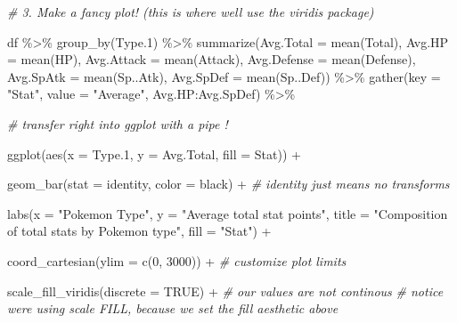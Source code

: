 \documentclass[
]{article}
\newenvironment{Shaded}{\begin{snugshade}}{\end{snugshade}}
\newcommand{\AttributeTok}[1]{\textcolor[rgb]{0.77,0.63,0.00}{#1}}
\newcommand{\CommentTok}[1]{\textcolor[rgb]{0.56,0.35,0.01}{\textit{#1}}}
\newcommand{\ConstantTok}[1]{\textcolor[rgb]{0.00,0.00,0.00}{#1}}
\newcommand{\DecValTok}[1]{\textcolor[rgb]{0.00,0.00,0.81}{#1}}
\newcommand{\FloatTok}[1]{\textcolor[rgb]{0.00,0.00,0.81}{#1}}
\newcommand{\FunctionTok}[1]{\textcolor[rgb]{0.00,0.00,0.00}{#1}}
\newcommand{\NormalTok}[1]{#1}
\newcommand{\SpecialCharTok}[1]{\textcolor[rgb]{0.00,0.00,0.00}{#1}}
\newcommand{\StringTok}[1]{\textcolor[rgb]{0.31,0.60,0.02}{#1}}
\begin{document}
\begin{Shaded}
\begin{Highlighting}[]
\CommentTok{\# 3. Make a fancy plot! (this is where we\textquotesingle{}ll use the viridis package)}

\NormalTok{df }\SpecialCharTok{\%\textgreater{}\%} 
  \FunctionTok{group\_by}\NormalTok{(Type}\FloatTok{.1}\NormalTok{) }\SpecialCharTok{\%\textgreater{}\%}
  \FunctionTok{summarize}\NormalTok{(}\AttributeTok{Avg.Total =} \FunctionTok{mean}\NormalTok{(Total),}
            \AttributeTok{Avg.HP =} \FunctionTok{mean}\NormalTok{(HP),}
            \AttributeTok{Avg.Attack =} \FunctionTok{mean}\NormalTok{(Attack),}
            \AttributeTok{Avg.Defense =} \FunctionTok{mean}\NormalTok{(Defense),}
            \AttributeTok{Avg.SpAtk =} \FunctionTok{mean}\NormalTok{(Sp..Atk),}
            \AttributeTok{Avg.SpDef =} \FunctionTok{mean}\NormalTok{(Sp..Def)) }\SpecialCharTok{\%\textgreater{}\%}
  \FunctionTok{gather}\NormalTok{(}\AttributeTok{key =} \StringTok{"Stat"}\NormalTok{, }\AttributeTok{value =} \StringTok{"Average"}\NormalTok{, Avg.HP}\SpecialCharTok{:}\NormalTok{Avg.SpDef) }\SpecialCharTok{\%\textgreater{}\%}  
  
  \CommentTok{\# transfer right into ggplot with a pipe !}
  
  \FunctionTok{ggplot}\NormalTok{(}\FunctionTok{aes}\NormalTok{(}\AttributeTok{x =}\NormalTok{ Type}\FloatTok{.1}\NormalTok{, }\AttributeTok{y =}\NormalTok{ Avg.Total, }\AttributeTok{fill =}\NormalTok{ Stat)) }\SpecialCharTok{+}
  
  \FunctionTok{geom\_bar}\NormalTok{(}\AttributeTok{stat =} \StringTok{\textquotesingle{}identity\textquotesingle{}}\NormalTok{, }\AttributeTok{color =} \StringTok{\textquotesingle{}black\textquotesingle{}}\NormalTok{) }\SpecialCharTok{+} \CommentTok{\# identity just means no transforms}
  
  \FunctionTok{labs}\NormalTok{(}\AttributeTok{x =} \StringTok{"Pokemon Type"}\NormalTok{,}
       \AttributeTok{y =} \StringTok{"Average total stat points"}\NormalTok{,}
       \AttributeTok{title =} \StringTok{"Composition of total stats by Pokemon type"}\NormalTok{,}
       \AttributeTok{fill =} \StringTok{"Stat"}\NormalTok{) }\SpecialCharTok{+}
  
  \FunctionTok{coord\_cartesian}\NormalTok{(}\AttributeTok{ylim =} \FunctionTok{c}\NormalTok{(}\DecValTok{0}\NormalTok{, }\DecValTok{3000}\NormalTok{)) }\SpecialCharTok{+}          \CommentTok{\# customize plot limits }
  
  \FunctionTok{scale\_fill\_viridis}\NormalTok{(}\AttributeTok{discrete =} \ConstantTok{TRUE}\NormalTok{) }\SpecialCharTok{+}         \CommentTok{\# our values are not continous}
  \CommentTok{\# notice we\textquotesingle{}re using scale FILL, because we set the fill aesthetic above}
  

\end{Highlighting}
\end{Shaded}
\end{document}
